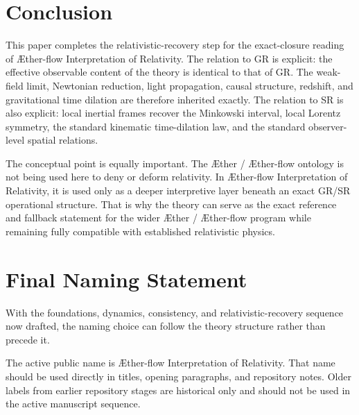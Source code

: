 \documentclass[11pt]{article}
\newcommand{\Aether}{\AE{}ther}
\newcommand{\Aflow}{\AE{}ther-flow}
\newcommand{\TheoryName}{\Aflow{} Interpretation of Relativity}
\begin{document}
\section{Conclusion}

This paper completes the relativistic-recovery step for the exact-closure reading of \TheoryName{}. The relation to GR is explicit: the effective observable content of the theory is identical to that of GR. The weak-field limit, Newtonian reduction, light propagation, causal structure, redshift, and gravitational time dilation are therefore inherited exactly. The relation to SR is also explicit: local inertial frames recover the Minkowski interval, local Lorentz symmetry, the standard kinematic time-dilation law, and the standard observer-level spatial relations.

The conceptual point is equally important. The \Aether{} / \Aflow{} ontology is not being used here to deny or deform relativity. In \TheoryName{}, it is used only as a deeper interpretive layer beneath an exact GR/SR operational structure. That is why the theory can serve as the exact reference and fallback statement for the wider \Aether{} / \Aflow{} program while remaining fully compatible with established relativistic physics.

\section{Final Naming Statement}

With the foundations, dynamics, consistency, and relativistic-recovery sequence now drafted, the naming choice can follow the theory structure rather than precede it.

The active public name is \TheoryName{}. That name should be used directly in titles, opening paragraphs, and repository notes. Older labels from earlier repository stages are historical only and should not be used in the active manuscript sequence.
\end{document}
